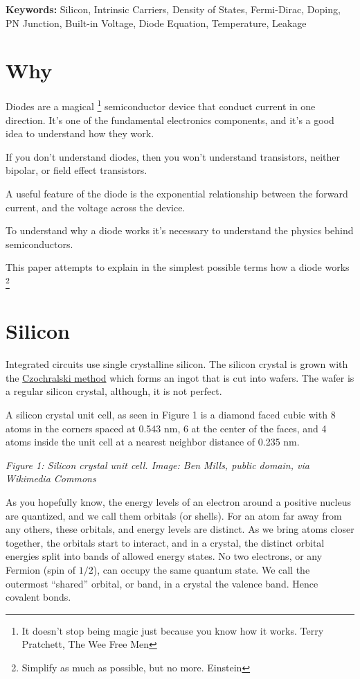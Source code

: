 \textbf{Keywords:} Silicon, Intrinsic Carriers, Density of States,
Fermi-Dirac, Doping, PN Junction, Built-in Voltage, Diode Equation,
Temperature, Leakage

\section{Why}\label{why}

Diodes are a magical \footnote{It doesn't stop being magic just because
  you know how it works. Terry Pratchett, The Wee Free Men}
semiconductor device that conduct current in one direction. It's one of
the fundamental electronics components, and it's a good idea to
understand how they work.

If you don't understand diodes, then you won't understand transistors,
neither bipolar, or field effect transistors.

A useful feature of the diode is the exponential relationship between
the forward current, and the voltage across the device.

To understand why a diode works it's necessary to understand the physics
behind semiconductors.

This paper attempts to explain in the simplest possible terms how a
diode works \footnote{Simplify as much as possible, but no more.
  Einstein}

\section{Silicon}\label{silicon}

Integrated circuits use single crystalline silicon. The silicon crystal
is grown with the
\href{https://en.wikipedia.org/wiki/Czochralski_method}{Czochralski
method} which forms an ingot that is cut into wafers. The wafer is a
regular silicon crystal, although, it is not perfect.

A silicon crystal unit cell, as seen in Figure 1 is a diamond faced
cubic with 8 atoms in the corners spaced at 0.543 nm, 6 at the center of
the faces, and 4 atoms inside the unit cell at a nearest neighbor
distance of 0.235 nm.


{
\centering
{}
}

\emph{Figure 1: Silicon crystal unit cell. Image: Ben Mills, public
domain, via Wikimedia Commons}

As you hopefully know, the energy levels of an electron around a
positive nucleus are quantized, and we call them orbitals (or shells).
For an atom far away from any others, these orbitals, and energy levels
are distinct. As we bring atoms closer together, the orbitals start to
interact, and in a crystal, the distinct orbital energies split into
bands of allowed energy states. No two electrons, or any Fermion (spin
of \(1/2\)), can occupy the same quantum state. We call the outermost
``shared'' orbital, or band, in a crystal the valence band. Hence
covalent bonds.

